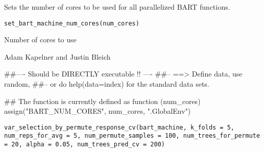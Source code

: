 \documentclass[a4paper]{book}
\begin{document}
%
\begin{Description}\relax
Sets the number of cores to be used for all parallelized BART functions.
\end{Description}
%
\begin{Usage}
\begin{verbatim}
set_bart_machine_num_cores(num_cores)
\end{verbatim}
\end{Usage}
%
\begin{Arguments}
\begin{ldescription}
\item[\code{num\_cores}] 
Number of cores to use

\end{ldescription}
\end{Arguments}
%
\begin{Author}\relax
Adam Kapelner and Justin Bleich
\end{Author}
%
\begin{Examples}
\begin{ExampleCode}
##---- Should be DIRECTLY executable !! ----
##-- ==>  Define data, use random,
##--	or do  help(data=index)  for the standard data sets.

## The function is currently defined as
function (num_cores) 
{
    assign("BART_NUM_CORES", num_cores, ".GlobalEnv")
  }
\end{ExampleCode}
\end{Examples}
%
\begin{Usage}
\begin{verbatim}
var_selection_by_permute_response_cv(bart_machine, k_folds = 5, num_reps_for_avg = 5, num_permute_samples = 100, num_trees_for_permute = 20, alpha = 0.05, num_trees_pred_cv = 200)
\end{verbatim}
\end{Usage}
%
\end{document}
